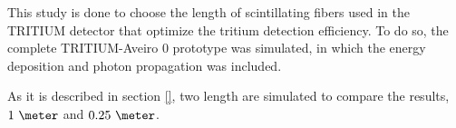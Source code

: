 This study is done to choose the length of scintillating fibers used in the TRITIUM detector that optimize the tritium detection efficiency. To do so, the complete TRITIUM-Aveiro 0 prototype was simulated, in which the energy deposition and photon propagation was included.






As it is described in section \ref{}, two length are simulated to compare the results, $1~\meter$ and $0.25~\meter$.